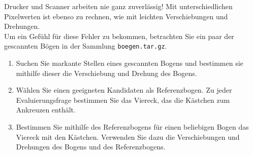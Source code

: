 \vspace{-1.5em}

Drucker und Scanner arbeiten nie ganz zuverlässig!
Mit unterschiedlichen Pixelwerten ist ebenso zu rechnen, wie mit leichten Verschiebungen und Drehungen.\\
Um ein Gefühl für diese Fehler zu bekommen, betrachten Sie ein paar der gescannten Bögen in der Sammlung \lstinline{boegen.tar.gz}.
\begin{enumerate}
\item Suchen Sie markante Stellen eines gescannten Bogens und bestimmen sie mithilfe dieser die Verschiebung und Drehung des Bogens.
\item Wählen Sie einen geeigneten Kandidaten als Referenzbogen. Zu jeder Evaluierungsfrage bestimmen Sie das Viereck, das die Kästchen zum Ankreuzen enthält.
\item Bestimmen Sie mithilfe des Referenzbogens für einen beliebigen Bogen das Viereck mit den Kästchen. Verwenden Sie dazu die Verschiebungen und Drehungen des Bogens und des Referenzbogens.
\end{enumerate}